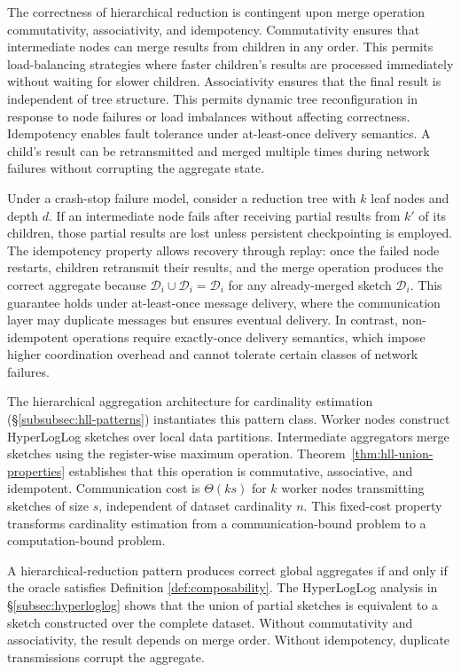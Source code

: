 The correctness of hierarchical reduction is contingent upon merge operation commutativity, associativity, and idempotency. Commutativity ensures that intermediate nodes can merge results from children in any order. This permits load-balancing strategies where faster children's results are processed immediately without waiting for slower children. Associativity ensures that the final result is independent of tree structure. This permits dynamic tree reconfiguration in response to node failures or load imbalances without affecting correctness. Idempotency enables fault tolerance under at-least-once delivery semantics. A child's result can be retransmitted and merged multiple times during network failures without corrupting the aggregate state.

Under a crash-stop failure model, consider a reduction tree with $k$ leaf nodes and depth $d$. If an intermediate node fails after receiving partial results from $k'$ of its children, those partial results are lost unless persistent checkpointing is employed. The idempotency property allows recovery through replay: once the failed node restarts, children retransmit their results, and the merge operation produces the correct aggregate because $\mathcal{D}_i \cup \mathcal{D}_i = \mathcal{D}_i$ for any already-merged sketch $\mathcal{D}_i$. This guarantee holds under at-least-once message delivery, where the communication layer may duplicate messages but ensures eventual delivery. In contrast, non-idempotent operations require exactly-once delivery semantics, which impose higher coordination overhead and cannot tolerate certain classes of network failures.

The hierarchical aggregation architecture for cardinality estimation (\S\ref{subsubsec:hll-patterns}) instantiates this pattern class. Worker nodes construct HyperLogLog sketches over local data partitions. Intermediate aggregators merge sketches using the register-wise maximum operation. Theorem~\ref{thm:hll-union-properties} establishes that this operation is commutative, associative, and idempotent. Communication cost is $\Theta(ks)$ for $k$ worker nodes transmitting sketches of size $s$, independent of dataset cardinality $n$. This fixed-cost property transforms cardinality estimation from a communication-bound problem to a computation-bound problem.

A hierarchical-reduction pattern produces correct global aggregates if and only if the oracle satisfies Definition \ref{def:composability}. The HyperLogLog analysis in \S\ref{subsec:hyperloglog} shows that the union of partial sketches is equivalent to a sketch constructed over the complete dataset. Without commutativity and associativity, the result depends on merge order. Without idempotency, duplicate transmissions corrupt the aggregate.

